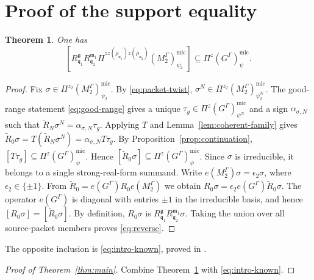 \documentclass[10pt]{amsart}
\numberwithin{equation}{section}
\theoremstyle{plain}
\newtheorem{theorem}[proposition]{Theorem}
\theoremstyle{definition}
\theoremstyle{remark}
\newcommand{\fg}{\mathfrak g}
\newcommand{\fm}{\mathfrak m}
\newcommand{\fq}{\mathfrak q}
\newcommand{\fu}{\mathfrak u}
\newcommand{\mic}{\mathrm{mic}}
\begin{document}
\section{Proof of the support equality}

\begin{theorem}\label{thm:reverse}
One has
\begin{equation}\label{eq:reverse}
 \left[
 R_{\fq_1}^{\fg}R_{\fq_2}^{\fm_1}
 \Pi^{zz(\rho_{\fu_1})z(\rho_{\fu_2})}
      (M_2^\Gamma)^{\mic}_{\psi_2}
 \right]
 \subseteq
 \Pi^z(G^\Gamma)^{\mic}_{\psi}.
\end{equation}
\end{theorem}

\begin{proof}
Fix $\sigma\in\Pi^{z_2}(M_2^\Gamma)^{\mic}_{\psi_2}$.
By \eqref{eq:packet-twist},
$\sigma^N\in\Pi^{z_2}(M_2^\Gamma)^{\mic}_{\psi_2^N}$. The 
good-range statement \eqref{eq:good-range} gives a unique
$\tau_g\in\Pi^z(G^\Gamma)^{\mic}_{\psi^N}$ and a sign
$\alpha_{\sigma,N}$ such that
$\widetilde R_N\sigma^N=\alpha_{\sigma,N}\tau_g$. Applying $T$ and
Lemma~\ref{lem:coherent-family} gives
$\widetilde R_0\sigma=T(\widetilde R_N\sigma^N)
=\alpha_{\sigma,N}T\tau_g$.
By Proposition~\ref{prop:continuation},
$[T\tau_g]\subseteq\Pi^z(G^\Gamma)^{\mic}_{\psi}$. Hence
$[\widetilde R_0\sigma]\subseteq\Pi^z(G^\Gamma)^{\mic}_{\psi}$.
Since $\sigma$ is irreducible, it belongs to a single strong-real-form
summand. Write $e(M_2^\Gamma)\sigma=\epsilon_2\sigma$, where
$\epsilon_2\in\{\pm1\}$. From
$\widetilde R_0=e(G^\Gamma)R_0e(M_2^\Gamma)$ we obtain
$R_0\sigma=\epsilon_2e(G^\Gamma)\widetilde R_0\sigma$.
The operator $e(G^\Gamma)$ is diagonal with entries $\pm1$ in the
irreducible basis, and hence
$[R_0\sigma]=[\widetilde R_0\sigma]$. By definition, $R_0\sigma$ is
$R_{\fq_1}^{\fg}R_{\fq_2}^{\fm_1}\sigma$. Taking the union over all
source-packet members proves \eqref{eq:reverse}.
\end{proof}

The opposite inclusion is \eqref{eq:intro-known}, proved in
\cite[Theorem~4.6.1(iii)]{AIMV26}.

\begin{proof}[Proof of Theorem~\ref{thm:main}]
Combine Theorem~\ref{thm:reverse} with \eqref{eq:intro-known}.
\end{proof}
\end{document}
